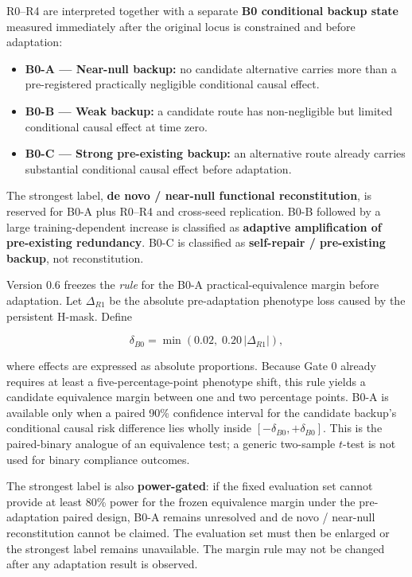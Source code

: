 R0--R4 are interpreted together with a separate \textbf{B0 conditional backup state} measured immediately after the original locus is constrained and before adaptation:

\begin{itemize}
\tightlist
\item \textbf{B0-A --- Near-null backup:} no candidate alternative carries more than a pre-registered practically negligible conditional causal effect.
\item \textbf{B0-B --- Weak backup:} a candidate route has non-negligible but limited conditional causal effect at time zero.
\item \textbf{B0-C --- Strong pre-existing backup:} an alternative route already carries substantial conditional causal effect before adaptation.
\end{itemize}

The strongest label, \textbf{de novo / near-null functional reconstitution}, is reserved for B0-A plus R0--R4 and cross-seed replication. B0-B followed by a large training-dependent increase is classified as \textbf{adaptive amplification of pre-existing redundancy}. B0-C is classified as \textbf{self-repair / pre-existing backup}, not reconstitution.

Version 0.6 freezes the \emph{rule} for the B0-A practical-equivalence margin before adaptation. Let $\Delta_{R1}$ be the absolute pre-adaptation phenotype loss caused by the persistent H-mask. Define

\[
\delta_{B0}=\min(0.02,\;0.20\,|\Delta_{R1}|),
\]

where effects are expressed as absolute proportions. Because Gate 0 already requires at least a five-percentage-point phenotype shift, this rule yields a candidate equivalence margin between one and two percentage points. B0-A is available only when a paired 90\% confidence interval for the candidate backup's conditional causal risk difference lies wholly inside $[-\delta_{B0},+\delta_{B0}]$. This is the paired-binary analogue of an equivalence test; a generic two-sample $t$-test is not used for binary compliance outcomes.

The strongest label is also \textbf{power-gated}: if the fixed evaluation set cannot provide at least 80\% power for the frozen equivalence margin under the pre-adaptation paired design, B0-A remains unresolved and de novo / near-null reconstitution cannot be claimed. The evaluation set must then be enlarged or the strongest label remains unavailable. The margin rule may not be changed after any adaptation result is observed.

